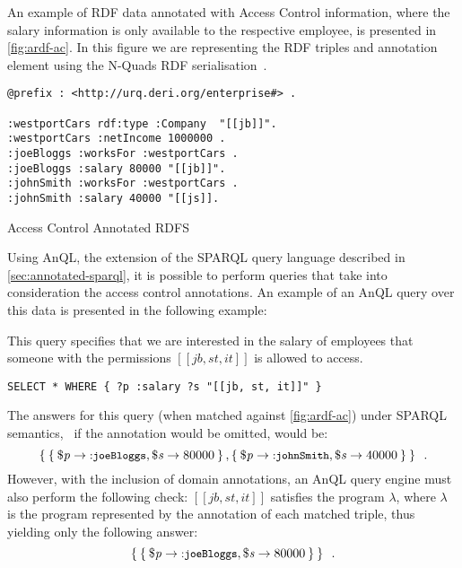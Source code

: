 An example of \ac{RDF} data annotated with Access Control information, where the salary information is only available to
the respective employee, is presented in \cref{fig:ardf-ac}.  In this figure we are representing the \ac{RDF} triples
and annotation element using the N-Quads \ac{RDF} serialisation~\cite{CyganiakHarthHogan:2009aa}.
%
\begin{data}[t]
\centering
\begin{lstlisting}[basicstyle=\tt\small]
@prefix : <http://urq.deri.org/enterprise#> . 

:westportCars rdf:type :Company  "[[jb]]".
:westportCars :netIncome 1000000 .
:joeBloggs :worksFor :westportCars .
:joeBloggs :salary 80000 "[[jb]]".
:johnSmith :worksFor :westportCars .
:johnSmith :salary 40000 "[[js]].
\end{lstlisting}
\caption{Access Control Annotated RDFS}
\label{fig:ardf-ac}
\end{data}
%
Using AnQL, the extension of the SPARQL query language described in \cref{sec:annotated-sparql}, it is possible
to perform queries that take into consideration the access control annotations.
%
An example of an AnQL query over this data is presented in the following example:
%
\begin{example}
  \label{sec:anql-ac-query} This query specifies that we are interested in the salary of employees that someone with the
  permissions $[[jb,st,it]]$ is allowed to access.
\begin{lstlisting}[basicstyle=\tt\small,frame=none,numbers=none]
SELECT * WHERE { ?p :salary ?s "[[jb, st, it]]" } 
\end{lstlisting}
  The answers for this query (when matched against \cref{fig:ardf-ac}) under SPARQL semantics,
  \ie~if the annotation would be omitted, would be:
  \[ \left\{\: 
    \left\{\: \$\mathit{p} \to \mbox{\small$\mathtt{{:}joeBloggs}$}, \$\mathit{s} \to 80000 \:\right\}, 
    \left\{\: \$\mathit{p} \to \mbox{\small$\mathtt{{:}johnSmith}$}, \$\mathit{s} \to 40000 \:\right\}
  \:\right\} \enspace.\]
  However, with the inclusion of domain annotations, an AnQL query engine must also perform the following check: \(
  [[jb,st,it]]\) satisfies the \nrdn program \(\lambda\),
  where $\lambda$ is the program represented by the annotation of each matched triple, thus yielding only the following
  answer:
  \[ \left\{\: 
    \left\{\: \$\mathit{p} \to \mbox{\small$\mathtt{{:}joeBloggs}$}, \$\mathit{s} \to 80000 \:\right\}
  \:\right\} \enspace. \]
\end{example}


